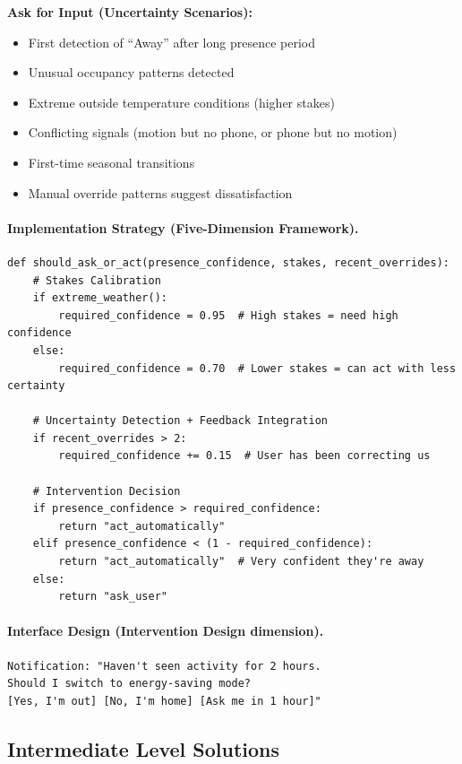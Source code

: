 \textbf{Ask for Input (Uncertainty Scenarios):}
\begin{itemize}
    \item First detection of ``Away'' after long presence period
    \item Unusual occupancy patterns detected
    \item Extreme outside temperature conditions (higher stakes)
    \item Conflicting signals (motion but no phone, or phone but no motion)
    \item First-time seasonal transitions
    \item Manual override patterns suggest dissatisfaction
\end{itemize}

\paragraph{Implementation Strategy (Five-Dimension Framework).}

\begin{lstlisting}[style=python, caption={Nest redesign decision logic}]
def should_ask_or_act(presence_confidence, stakes, recent_overrides):
    # Stakes Calibration
    if extreme_weather():
        required_confidence = 0.95  # High stakes = need high confidence
    else:
        required_confidence = 0.70  # Lower stakes = can act with less certainty

    # Uncertainty Detection + Feedback Integration
    if recent_overrides > 2:
        required_confidence += 0.15  # User has been correcting us

    # Intervention Decision
    if presence_confidence > required_confidence:
        return "act_automatically"
    elif presence_confidence < (1 - required_confidence):
        return "act_automatically"  # Very confident they're away
    else:
        return "ask_user"
\end{lstlisting}

\paragraph{Interface Design (Intervention Design dimension).}
\begin{verbatim}
Notification: "Haven't seen activity for 2 hours.
Should I switch to energy-saving mode?
[Yes, I'm out] [No, I'm home] [Ask me in 1 hour]"
\end{verbatim}

\subsection{Intermediate Level Solutions}

